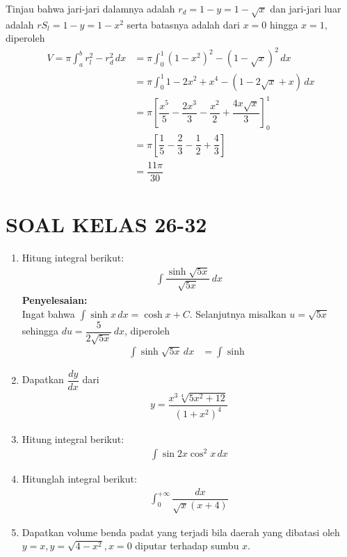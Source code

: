 \documentclass{article}
\begin{document}
\begin{enumerate}
\begin{center}
		\end{center}
		Tinjau bahwa jari-jari dalamnya adalah $r_d=1-y=1-\sqrt{x}$ dan jari-jari luar adalah $rS_l=1-y=1-x^2$ serta batasnya adalah dari $x=0$ hingga $x=1$, diperoleh
		\begin{align*}
		V=\pi\int_a^b r_l^2-r_d^2 \, dx &= \pi \int_0^1 (1-x^2)^2-(1-\sqrt{x})^2\, dx\\
		&= \pi \int_0^1 1-2x^2+x^4-(1-2\sqrt{x}+x)\, dx\\
		&= \pi\left[\dfrac{x^5}{5}-\dfrac{2x^3}{3}-\dfrac{x^2}{2}+\dfrac{4x\sqrt{x}}{3}\right]^1_0\\
		&= \pi \left[\dfrac{1}{5}-\dfrac{2}{3}-\dfrac{1}{2}+\dfrac{4}{3}\right]\\
		&= \dfrac{11\pi}{30}
		\end{align*}
\end{enumerate}
\section*{SOAL KELAS 26-32}
\begin{enumerate}
	\item Hitung integral berikut:
	\begin{align*}
	\int \dfrac{\sinh \sqrt{5x}}{\sqrt{5x}}\, dx
	\end{align*}
	\textbf{Penyelesaian:}\\
	Ingat bahwa $\displaystyle \int \sinh x \, dx = \cosh x +C$. Selanjutnya misalkan $u=\sqrt{5x}$ sehingga $du = \dfrac{5}{2\sqrt{5x}}\, dx$, diperoleh 
	\begin{align*}
	\int \sinh \sqrt{5x}\, dx &= \int \sinh \
	\end{align*}
	\item Dapatkan $\dfrac{dy}{dx}$ dari 
	\begin{align*}
	y= \dfrac{x^3\sqrt[4]{5x^2+12}}{(1+x^2)^4}
	\end{align*}
	\item Hitung integral berikut:
	\begin{align*}
	\int \sin 2x\cos^2 x\, dx
	\end{align*}
	\item Hitunglah integral berikut:
	\begin{align*}
	\int_0^{+\infty} \dfrac{dx}{\sqrt{x}(x+4)}
	\end{align*}
	\item Dapatkan volume benda padat yang terjadi bila daerah yang dibatasi oleh $y=x,y=\sqrt{4-x^2},x=0$ diputar terhadap sumbu $x$.
\end{enumerate}
\end{document}

